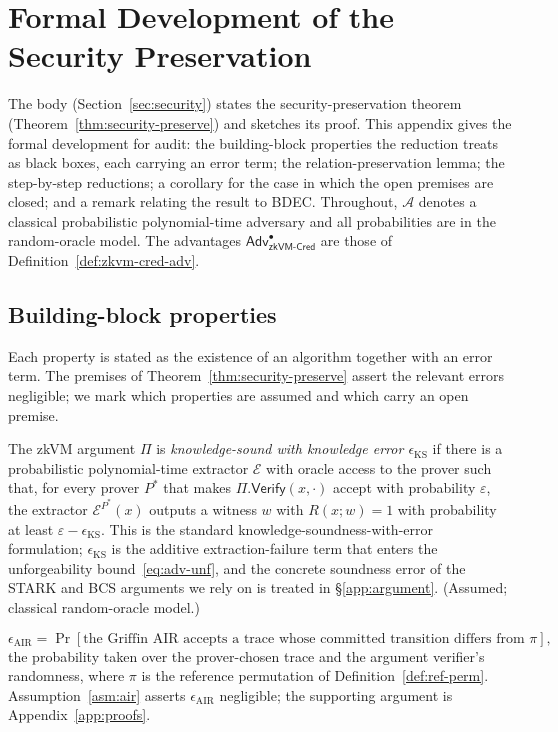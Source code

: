 \appendix

\section{Formal Development of the Security Preservation}\label{app:preservation}
The body (Section~\ref{sec:security}) states the security-preservation theorem (Theorem~\ref{thm:security-preserve}) and sketches its proof. This appendix gives the formal development for audit: the building-block properties the reduction treats as black boxes, each carrying an error term; the relation-preservation lemma; the step-by-step reductions; a corollary for the case in which the open premises are closed; and a remark relating the result to BDEC. Throughout, $\mathcal A$ denotes a classical probabilistic polynomial-time adversary and all probabilities are in the random-oracle model. The advantages $\mathsf{Adv}^{\bullet}_{\mathsf{zkVM\text{-}Cred}}$ are those of Definition~\ref{def:zkvm-cred-adv}.

\subsection{Building-block properties}\label{app:prsv-defs}
Each property is stated as the existence of an algorithm together with an error term. The premises of Theorem~\ref{thm:security-preserve} assert the relevant errors negligible; we mark which properties are assumed and which carry an open premise.

\begin{definition}\label{def:ks}
The zkVM argument $\Pi$ is \emph{knowledge-sound with knowledge error $\epsilon_{\mathrm{KS}}$} if there is a probabilistic polynomial-time extractor $\mathcal{E}$ with oracle access to the prover such that, for every prover $P^\ast$ that makes $\Pi.\mathsf{Verify}(x,\cdot)$ accept with probability $\varepsilon$, the extractor $\mathcal{E}^{P^\ast}(x)$ outputs a witness $w$ with $R(x;w)=1$ with probability at least $\varepsilon-\epsilon_{\mathrm{KS}}$. This is the standard knowledge-soundness-with-error formulation; $\epsilon_{\mathrm{KS}}$ is the additive extraction-failure term that enters the unforgeability bound~\eqref{eq:adv-unf}, and the concrete soundness error of the STARK and BCS arguments we rely on is treated in \S\ref{app:argument}. (Assumed; classical random-oracle model.)
\end{definition}

\begin{definition}\label{def:eair}
    \begin{equation*}\epsilon_{\mathrm{AIR}}=\Pr[\text{the Griffin AIR accepts a trace whose committed transition differs from }\pi],\end{equation*}the probability taken over the prover-chosen trace and the argument verifier's randomness, where $\pi$ is the reference permutation of Definition~\ref{def:ref-perm}. Assumption~\ref{asm:air} asserts $\epsilon_{\mathrm{AIR}}$ negligible; the supporting argument is Appendix~\ref{app:proofs}.
\end{definition}

